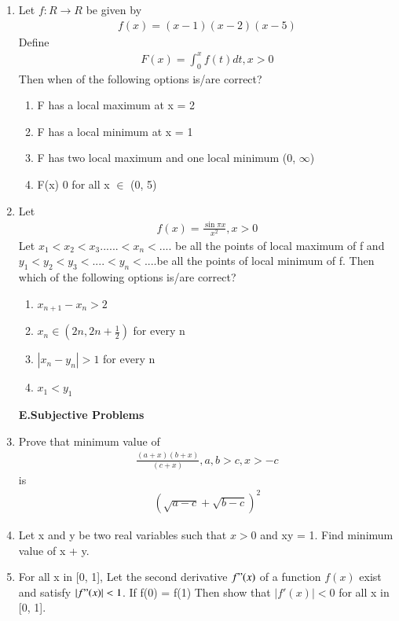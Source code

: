 \begin{enumerate}[label=\arabic*.,ref=\thesubsection.\theenumi]
\item Let $f: R \to R$ be given by 
\begin{align*}
f(x) = (x - 1)(x - 2)(x - 5)
\end{align*}
 Define 
\begin{align*}
F(x) = \int_{0}^{x} f(t)dt, x > 0
\end{align*} 
Then when of the following options is/are correct?
\begin{enumerate}
\item F has a local maximum at x = 2
\item F has a local minimum at x = 1
\item F has two local maximum and one local minimum (0, $\infty$)
\item F(x) 0 for all x $\in$ (0, 5) 
\end{enumerate}

\item Let 
\begin{align*}
f(x) = \frac{\sin \pi x}{x^2}, x > 0
\end{align*}
Let $x_1 < x_2 < x_3...... < x_n < $.... be all the points of local maximum of f and $y_1 < y_2 < y_3 < $....$ < y_n <$....be all the points of local minimum of f. Then which of the following options is/are correct?
\begin{enumerate}
\item $x_{n + 1} - x_n > 2$
\item $x_n \in (2n, 2n + \frac{1}{2})$ for every n
\item $|x_n - y_n| > 1$ for every n
\item $x_1 < y_1$
\end{enumerate}

\textbf{E.Subjective Problems}

\item Prove that minimum value of
\begin{align*} 
\frac{(a + x)(b + x)}{(c + x)}, a, b > c, x > -c
\end{align*} 
is
\begin{align*} 
(\sqrt{a - c} + \sqrt{b - c})^2
\end{align*}
 
\item Let x and y be two real variables such that $x > 0$ and xy = 1. Find minimum value of x + y.

\item For all x in [0, 1], Let the second derivative $f"(x)$ of a function $f(x)$ exist and satisfy $|f"(x)| < 1$. If f(0) = f(1) Then show that $|f'(x)|<0$ for all x in [0, 1].


\end{enumerate}
